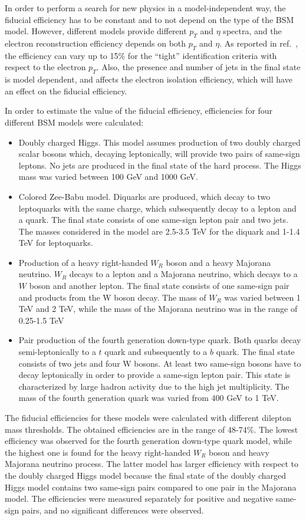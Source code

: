 In order to perform a search for new physics in a model-independent way, the fiducial efficiency has to be constant and to not depend on the type of the BSM model.
However, different models provide different $p_T$ and $\eta$ spectra, and the electron reconstruction efficiency depends on both $p_T$ and $\eta$.
As reported in ref.~\cite{electron_tight}, the efficiency can vary up to 15$\%$ for the ``tight'' identification criteria with respect to the electron $p_T$.
Also, the presence and number of jets in the final state is model dependent, and affects the electron isolation efficiency, which will have an effect on 
the fiducial efficiency.

In order to estimate the value of the fiducial efficiency, efficiencies for four different BSM models were calculated:
\begin{itemize}
 \item Doubly charged Higgs. This model assumes production of two doubly charged scalar bosons which, decaying leptonically, will provide two pairs of same-sign leptons.
 No jets are produced in the final state of the hard process. The Higgs mass was varied between 100 GeV and 1000 GeV.
 \item Colored Zee-Babu model. Diquarks are produced, which decay to two leptoquarks with the same charge, 
 which subsequently decay to a lepton and a quark. The final state consists of one same-sign lepton pair and two jets.
 The masses considered in the model are 2.5-3.5 TeV for the diquark and 1-1.4 TeV for leptoquarks.
 \item Production of a heavy right-handed $W_R$ boson and a heavy Majorana neutrino. $W_R$ decays to a lepton and a Majorana neutrino, 
 which decays to a $W$ boson and another lepton. The final state consists of one same-sign pair and products from the W boson decay.
 The mass of $W_R$ was varied between 1 TeV and 2 TeV, while the mass of the Majorana neutrino was in the range of 0.25-1.5 TeV
 \item Pair production of the fourth generation down-type quark. Both quarks decay semi-leptonically to a $t$ quark and subsequently to a $b$ quark.
 The final state consists of two jets and four W bosons. At least two same-sign bosons have to decay leptonically in order to provide a same-sign lepton pair.
 This state is characterized by large hadron activity due to the high jet multiplicity.
 The mass of the fourth generation quark was varied from 400 GeV to 1 TeV.
\end{itemize}
The fiducial efficiencies for these models were calculated with different dilepton mass thresholds.
The obtained efficiencies are in the range of 48-74$\%$. The lowest efficiency was observed for the fourth generation down-type quark model, while the highest one is found for the heavy right-handed $W_R$ boson and heavy Majorana neutrino process. The latter model has larger efficiency with respect to the doubly charged Higgs model
because the final state of the doubly charged Higgs model contains two same-sign pairs compared to one pair in the Majorana model.
The efficiencies were measured separately for positive and negative same-sign pairs, and no significant differences were observed.

